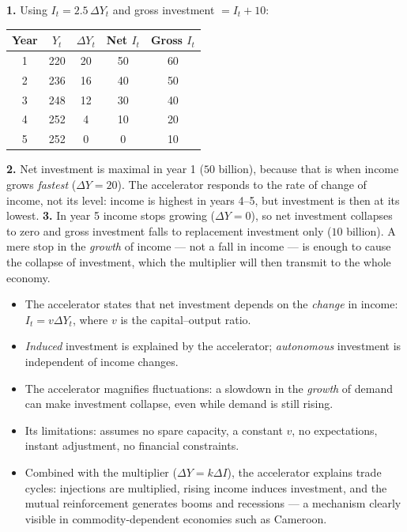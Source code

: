 \documentclass[11pt]{article}
\newcommand{\cle}[1]{{\popxbold\color{popdark}#1}}
\begin{document}
\begin{corrige}[Exercise 1]
\textbf{1.} Using $I_t=2.5\,\Delta Y_t$ and gross investment $=I_t+10$:
\begin{center}
\begin{tabular}{|c|c|c|c|c|}
\hline
\rowcolor{popblueL} Year & $Y_t$ & $\Delta Y_t$ & Net $I_t$ & Gross $I_t$ \\
\hline
1 & 220 & 20 & 50 & 60 \\
\hline
2 & 236 & 16 & 40 & 50 \\
\hline
3 & 248 & 12 & 30 & 40 \\
\hline
4 & 252 & 4 & 10 & 20 \\
\hline
5 & 252 & 0 & 0 & 10 \\
\hline
\end{tabular}
\end{center}
\textbf{2.} Net investment is maximal in year 1 ($50$ billion), because that is when income grows \emph{fastest} ($\Delta Y=20$). The accelerator responds to the rate of change of income, not its level: income is highest in years 4--5, but investment is then at its lowest.
\textbf{3.} In year 5 income stops growing ($\Delta Y=0$), so net investment collapses to zero and gross investment falls to replacement investment only ($10$ billion). A mere stop in the \emph{growth} of income --- not a fall in income --- is enough to cause the collapse of investment, which the multiplier will then transmit to the whole economy.
\end{corrige}

\begin{aretenir}
\begin{itemize}
\item The \cle{accelerator} states that net investment depends on the \emph{change} in income: $I_t=v\Delta Y_t$, where $v$ is the capital--output ratio.
\item \emph{Induced} investment is explained by the accelerator; \emph{autonomous} investment is independent of income changes.
\item The accelerator magnifies fluctuations: a slowdown in the \emph{growth} of demand can make investment collapse, even while demand is still rising.
\item Its limitations: assumes no spare capacity, a constant $v$, no expectations, instant adjustment, no financial constraints.
\item Combined with the multiplier ($\Delta Y=k\Delta I$), the accelerator explains \cle{trade cycles}: injections are multiplied, rising income induces investment, and the mutual reinforcement generates booms and recessions --- a mechanism clearly visible in commodity-dependent economies such as Cameroon.
\end{itemize}
\end{aretenir}
\end{document}
